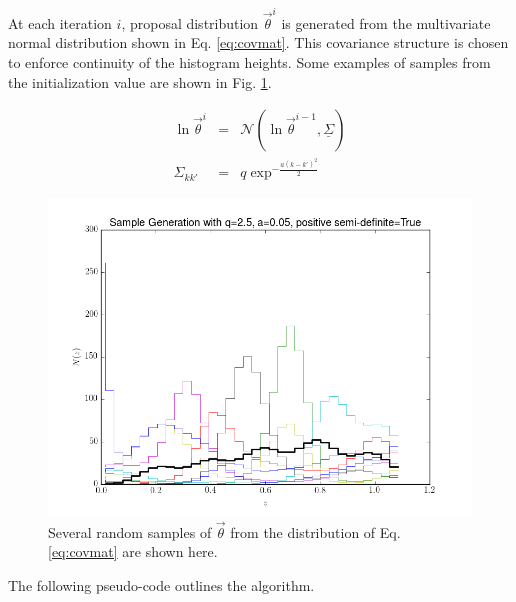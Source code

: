 \documentclass[12pt, onecolumn]{emulateapj}
\newcommand{\textul}{\underline}
\begin{document}
At each iteration $i$, proposal distribution $\vec{\theta}^{i}$ is generated from the multivariate normal distribution shown in Eq. \ref{eq:covmat}.  This covariance structure is chosen to enforce continuity of the histogram heights.  Some examples of samples from the initialization value are shown in Fig. \ref{fig:priors}.

\begin{mathletters}
\begin{eqnarray}
\label{eq:covmat}
\ln\vec{\theta}^{i} &=& \mathcal{N}(\ln\vec{\theta}^{i-1},\textul{\Sigma})\\
\Sigma_{kk'} &=& q\exp^{-\frac{a(k-k')^{2}}{2}}\nonumber
\end{eqnarray}
\end{mathletters}

\begin{figure}
\label{fig:priors}
\includegraphics[scale=0.5]{samples5.png}
\caption{Several random samples of $\vec{\theta}$ from the distribution of Eq. \ref{eq:covmat} are shown here.  %
}
\end{figure}

The following pseudo-code outlines the algorithm.
\end{document}
